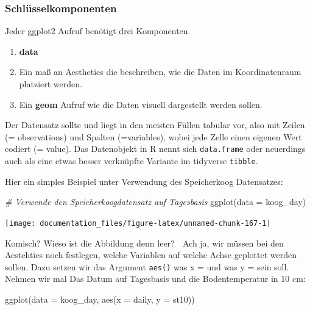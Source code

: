 \documentclass[
]{article}
\newenvironment{Shaded}{\begin{snugshade}}{\end{snugshade}}
\newcommand{\AttributeTok}[1]{\textcolor[rgb]{0.77,0.63,0.00}{#1}}
\newcommand{\CommentTok}[1]{\textcolor[rgb]{0.56,0.35,0.01}{\textit{#1}}}
\newcommand{\FunctionTok}[1]{\textcolor[rgb]{0.00,0.00,0.00}{#1}}
\newcommand{\NormalTok}[1]{#1}
\providecommand{\tightlist}{%
  \setlength{\itemsep}{0pt}\setlength{\parskip}{0pt}}
\begin{document}
\hypertarget{schluxfcsselkomponenten}{%
\subsubsection{Schlüsselkomponenten}\label{schluxfcsselkomponenten}}

Jeder ggplot2 Aufruf benötigt drei Komponenten.

\begin{enumerate}
\def\labelenumi{\arabic{enumi}.}
\tightlist
\item
  \textbf{data}
\item
  Ein maß an Aesthetics die beschreiben, wie die Daten im Koordinatenraum platziert werden.
\item
  Ein \textbf{geom} Aufruf wie die Daten visuell dargestellt werden sollen.
\end{enumerate}

Der Datensatz sollte und liegt in den meisten Fällen tabular vor, also mit Zeilen (= observations) und Spalten (=variables), wobei jede Zelle einen eigenen Wert codiert (= value). Das Datenobjekt in R nennt sich \texttt{data.frame} oder neuerdings auch als eine etwas besser verknüpfte Variante im tidyverse \texttt{tibble}.

Hier ein simples Beispiel unter Verwendung des Speicherkoog Datensatzes:

\begin{Shaded}
\begin{Highlighting}[]
\CommentTok{\# Verwende den Speicherkoogdatensatz auf Tagesbasis}
\FunctionTok{ggplot}\NormalTok{(}\AttributeTok{data =}\NormalTok{ koog\_day)}
\end{Highlighting}
\end{Shaded}

\begin{center}\texttt{[image: documentation\_files/figure-latex/unnamed-chunk-167-1]} \end{center}

Komisch? Wieso ist die Abbildung denn leer? 🤯 Ach ja, wir müssen bei den Aestehtics noch festlegen, welche Variablen auf welche Achse geplottet werden sollen. Dazu setzen wir das Argument \texttt{aes()} was x = und was y = sein soll. Nehmen wir mal Das Datum auf Tagesbasis und die Bodentemperatur in 10 cm:

\begin{Shaded}
\begin{Highlighting}[]
\FunctionTok{ggplot}\NormalTok{(}\AttributeTok{data =}\NormalTok{ koog\_day, }\FunctionTok{aes}\NormalTok{(}\AttributeTok{x =}\NormalTok{ daily, }\AttributeTok{y =}\NormalTok{ st10))}
\end{Highlighting}
\end{Shaded}
\end{document}
